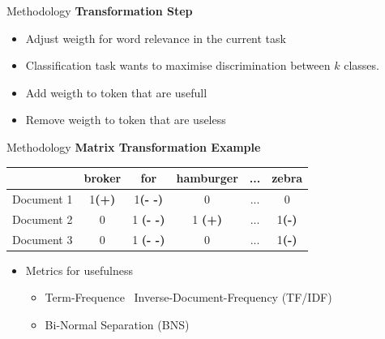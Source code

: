 \begin{frame}[label=metho]{Methodology}
	\textbf{Transformation Step}
	\begin{itemize}
		\item Adjust weigth for word relevance in the current task
		\item Classification task wants to maximise discrimination between $k$ classes.
		\item Add weigth to token that are usefull
		\item Remove weigth to token that are useless
		
	\end{itemize}
\end{frame}



\begin{frame}[label=metho]{Methodology}
	\textbf{Matrix Transformation Example}
	
	
	\begin{table}[H]
		\centering
		\begin{tabular}{|c|c|c|c|c|c|}
			\hline 
			&  broker  & for & hamburger & ... & zebra   \\ 
			\hline 
			Document 1 &    1\textbf{(+)} & 1\textbf{(- -)} & 0 & ... & 0  \\ 
			\hline 
			Document 2&    0 &  1 \textbf{(- -)}& 1 \textbf{(+)} & ... & 1\textbf{(-)} \\ 
			\hline 
			Document 3 &    0 & 1 \textbf{(- -)} & 0 & ... & 1\textbf{(-)}  \\ 
			\hline 
			
		\end{tabular} 
		
	\end{table}
	
\begin{itemize}
	\item Metrics for usefulness
	\begin{itemize}
		\item Term-Frequence \ Inverse-Document-Frequency (TF/IDF)
		\item Bi-Normal Separation (BNS)
	\end{itemize}
\end{itemize}

\end{frame}


